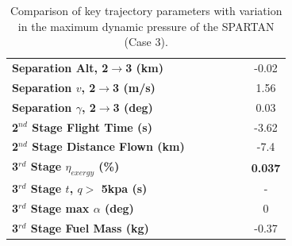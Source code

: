 \begin{table}[ht!]
\begin{tabular}{l c c c c c c}
	\textbf{Separation Alt, 2$\rightarrow$3 (km)}
	& \secondthirdSeparationAltqFortyNoReturn
	& \secondthirdSeparationAltqFortyFiveNoReturn
	& \secondthirdSeparationAltqStandardNoReturn
	& \secondthirdSeparationAltqFiftyFiveNoReturn
	& \secondthirdSeparationAltqSixtyNoReturn
	&-0.02
	\\
	\textbf{Separation $v$, 2$\rightarrow$3 (m/s)}
	& \secondthirdSeparationvqFortyNoReturn
	& \secondthirdSeparationvqFortyFiveNoReturn
	& \secondthirdSeparationvqStandardNoReturn
	& \secondthirdSeparationvqFiftyFiveNoReturn
	& \secondthirdSeparationvqSixtyNoReturn
	&1.56
	\\
	\textbf{Separation $\gamma$, 2$\rightarrow$3 (deg)}
	& \secondthirdSeparationgammaqFortyNoReturn
	& \secondthirdSeparationgammaqFortyFiveNoReturn
	& \secondthirdSeparationgammaqStandardNoReturn
	& \secondthirdSeparationgammaqFiftyFiveNoReturn
	& \secondthirdSeparationgammaqSixtyNoReturn
	&0.03
	\\
	\textbf{2$^{nd}$ Stage Flight Time (s)}
	& \secondFlightTimeqFortyNoReturn
	& \secondFlightTimeqFortyFiveNoReturn
	& \secondFlightTimeqStandardNoReturn
	& \secondFlightTimeqFiftyFiveNoReturn
	& \secondFlightTimeqSixtyNoReturn
	&-3.62
	\\
	\textbf{2$^{nd}$ Stage Distance Flown (km)}
	& \SecondDistqFortyNoReturn
	& \SecondDistqFortyFiveNoReturn
	& \SecondDistqStandardNoReturn
	& \SecondDistqFiftyFiveNoReturn
	& \SecondDistqSixtyNoReturn
	&-7.4
	\\
	\hline 
	\textbf{3$^{rd}$ Stage $\eta_{exergy}$ (\%)}
	& \textbf{\thirddExergyEffqFortyNoReturn}
	& \textbf{\thirddExergyEffqFortyFiveNoReturn}
	& \textbf{\thirddExergyEffqStandardNoReturn}
	& \textbf{\thirddExergyEffqFiftyFiveNoReturn}
	& \textbf{\thirddExergyEffqSixtyNoReturn}
	& \textbf{0.037}
	\\

	\textbf{3$^{rd}$ Stage $t$, $q >$ 5kpa (s)}
	& \thirdqOverFiveqFortyNoReturn
	& \thirdqOverFiveqFortyFiveNoReturn
	& \thirdqOverFiveqStandardNoReturn
	& \thirdqOverFiveqFiftyFiveNoReturn
	& \thirdqOverFiveqSixtyNoReturn
	& -
	\\
	\textbf{3$^{rd}$ Stage max $\alpha$ (deg)}
	& \thirdmaxAoAqFortyNoReturn
	& \thirdmaxAoAqFortyFiveNoReturn
	& \thirdmaxAoAqStandardNoReturn
	& \thirdmaxAoAqFiftyFiveNoReturn
	& \thirdmaxAoAqSixtyNoReturn
	&0
	\\
	\textbf{3$^{rd}$ Stage Fuel Mass (kg)}
	& \thirdmFuelqFortyNoReturn
	& \thirdmFuelqFortyFiveNoReturn
	& \thirdmFuelqStandardNoReturn
	& \thirdmFuelqFiftyFiveNoReturn
	& \thirdmFuelqSixtyNoReturn
	&-0.37
	\\
	\hline 
\end{tabular}  
	\caption{Comparison of key trajectory parameters with variation in the maximum dynamic pressure of the SPARTAN (Case 3).}
	\label{tab:qvarnoreturn}
\end{table}





